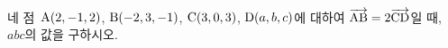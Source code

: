 네 점~$\mathrm{A}(2{,}\mkern3mu\mathopen{}-1{,}\mkern3mu\mathopen{}2)$, $\mathrm{B}(-2{,}\mkern3mu\mathopen{}3{,}\mkern3mu\mathopen{}-1)$, $\mathrm{C}(3{,}\mkern3mu\mathopen{}0{,}\mkern3mu\mathopen{}3)$, $\mathrm{D}(a{,}\mkern3mu\mathopen{}b{,}\mkern3mu\mathopen{}c)$에 대하여 $\overrightarrow{\mathrm{AB}}=2\overrightarrow{\mathrm{CD}}$일 때, $abc$의 값을 구하시오.
